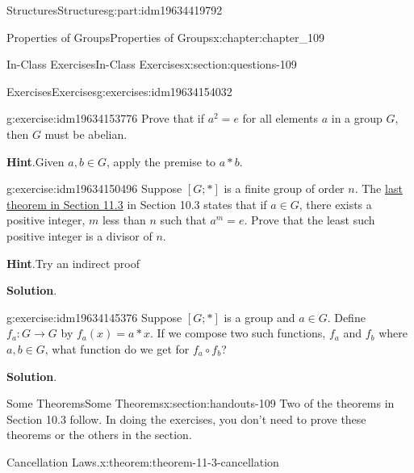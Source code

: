 \documentclass[oneside,10pt,]{book}
\newcommand{\blocktitlefont}{\relax}
\numberwithin{equation}{section}
\begin{document}
\begin{partptx}{Structures}{}{Structures}{}{}{g:part:idm19634419792}
\begin{chapterptx}{Properties of Groups}{}{Properties of Groups}{}{}{x:chapter:chapter_109}
\begin{sectionptx}{In-Class Exercises}{}{In-Class Exercises}{}{}{x:section:questions-109}
\begin{exercises-subsection-numberless}{Exercises}{}{Exercises}{}{}{g:exercises:idm19634154032}
\par\medskip\noindent%
%
\begin{exercisegroup}
\begin{divisionexerciseeg}{1}{}{}{g:exercise:idm19634153776}%
Prove that if \(a^2 = e\) for all elements \(a\) in a group \(G\), then \(G\) must be abelian.%
\par\smallskip%
\noindent\textbf{\blocktitlefont Hint}.\hypertarget{g:hint:idm19634151728}{}\quad{}Given \(a, b \in G\), apply the premise to \(a*b\).%
\end{divisionexerciseeg}%
\begin{divisionexerciseeg}{2}{}{}{g:exercise:idm19634150496}%
Suppose \([G;*]\) is a finite group of order \(n\). The \hyperref[x:theorem:theorem-11-3-finite]{last theorem in Section 11.3} in Section 10.3 states that if \(a\in G\), there exists a positive integer, \(m\) less than \(n\) such that \(a^m=e\).  Prove that the least such positive integer is a divisor of \(n\).%
\par\smallskip%
\noindent\textbf{\blocktitlefont Hint}.\hypertarget{g:hint:idm19634150032}{}\quad{}Try an indirect proof%
\par\smallskip%
\noindent\textbf{\blocktitlefont Solution}.\hypertarget{g:solution:idm19634145632}{}\quad{}%
\end{divisionexerciseeg}%
\begin{divisionexerciseeg}{3}{}{}{g:exercise:idm19634145376}%
Suppose \([G;*]\) is a group and \(a \in G\).  Define \(f_a:G \to  G\) by \(f_a(x) = a * x\).  If we compose two such functions, \(f_a\) and \(f_b\) where \(a, b \in G\), what function do we get for \(f_a \circ f_b\)?%
\par\smallskip%
\noindent\textbf{\blocktitlefont Solution}.\hypertarget{g:solution:idm19634144992}{}\quad{}%
\end{divisionexerciseeg}%
\end{exercisegroup}
\par\medskip\noindent
\end{exercises-subsection-numberless}
\end{sectionptx}
%
%
\typeout{************************************************}
\typeout{************************************************}
%
\begin{sectionptx}{Some Theorems}{}{Some Theorems}{}{}{x:section:handouts-109}
Two of the theorems in Section 10.3 follow. In doing the exercises, you don't need to prove these theorems or the others in the section.%
\begin{theorem}{Cancellation Laws.}{}{x:theorem:theorem-11-3-cancellation}%

\end{theorem}
\end{sectionptx}
\end{chapterptx}
\end{partptx}
\end{document}
